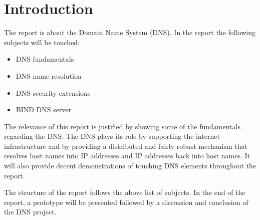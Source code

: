 \chapter{Introduction}

The report is about the Domain Name System (DNS). In the report the following subjects will be touched:

\begin{itemize}
\item DNS fundamentals
\item DNS name resolution
\item DNS security extensions
\item BIND DNS server
\end{itemize}

The relevance of this report is justified by showing some of the fundamentals regarding the DNS.
The DNS plays its role by supporting the internet infrastructure and by providing a distributed and fairly robust mechanism that resolves host names into IP addresses and IP addresses back into host names. It will also provide decent demonstrations of touching DNS elements throughout the report.

The structure of the report follows the above list of subjects. In the end of the report, a prototype will be presented followed by a discussion and conclusion of the DNS project. 